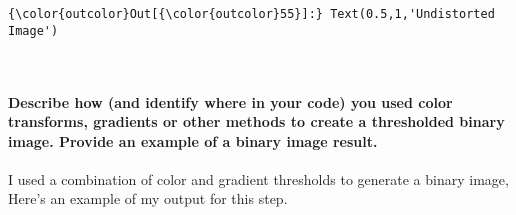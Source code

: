 \documentclass[11pt]{article}
\begin{document}
\begin{Verbatim}[commandchars=\\\{\}]
{\color{outcolor}Out[{\color{outcolor}55}]:} Text(0.5,1,'Undistorted Image')
\end{Verbatim}
            
    \begin{center}
    \end{center}
    { \hspace*{\fill} \\}
    
    \paragraph{Describe how (and identify where in your code) you used color
transforms, gradients or other methods to create a thresholded binary
image. Provide an example of a binary image
result.}\label{describe-how-and-identify-where-in-your-code-you-used-color-transforms-gradients-or-other-methods-to-create-a-thresholded-binary-image.-provide-an-example-of-a-binary-image-result.}

I used a combination of color and gradient thresholds to generate a
binary image, Here's an example of my output for this step.
\end{document}
